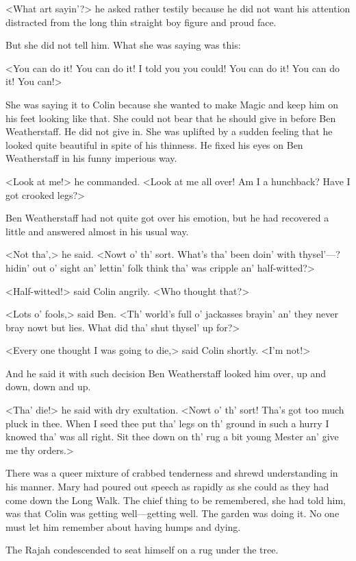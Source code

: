<What art sayin'?> he asked rather testily because he did not want his attention distracted from the long thin straight boy figure and proud face.

But she did not tell him. What she was saying was this:

<You can do it! You can do it! I told you you could! You can do it! You can do it! You can!>

She was saying it to Colin because she wanted to make Magic and keep him on his feet looking like that. She could not bear that he should give in before Ben Weatherstaff. He did not give in. She was uplifted by a sudden feeling that he looked quite beautiful in spite of his thinness. He fixed his eyes on Ben Weatherstaff in his funny imperious way.

<Look at me!> he commanded. <Look at me all over! Am I a hunchback? Have I got crooked legs?>

Ben Weatherstaff had not quite got over his emotion, but he had recovered a little and answered almost in his usual way.

<Not tha',> he said. <Nowt o' th' sort. What's tha' been doin' with thysel'—? hidin' out o' sight an' lettin' folk think tha' was cripple an' half-witted?>

<Half-witted!> said Colin angrily. <Who thought that?>

<Lots o' fools,> said Ben. <Th' world's full o' jackasses brayin' an' they never bray nowt but lies. What did tha' shut thysel' up for?>

<Every one thought I was going to die,> said Colin shortly. <I'm not!>

And he said it with such decision Ben Weatherstaff looked him over, up and down, down and up.

<Tha' die!> he said with dry exultation. <Nowt o' th' sort! Tha's got too much pluck in thee. When I seed thee put tha' legs on th' ground in such a hurry I knowed tha' was all right. Sit thee down on th' rug a bit young Mester an' give me thy orders.>

There was a queer mixture of crabbed tenderness and shrewd understanding in his manner. Mary had poured out speech as rapidly as she could as they had come down the Long Walk. The chief thing to be remembered, she had told him, was that Colin was getting well—getting well. The garden was doing it. No one must let him remember about having humps and dying.

The Rajah condescended to seat himself on a rug under the tree.

